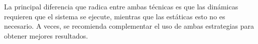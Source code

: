 \documentclass[a4paper,12pt]{report}
\begin{document}
La principal diferencia que radica entre ambas técnicas es que las dinámicas requieren que el sistema se ejecute, mientras que las estáticas esto no es necesario. A veces, se recomienda complementar el uso de ambas estrategias para obtener mejores resultados.









 
\end{document}
